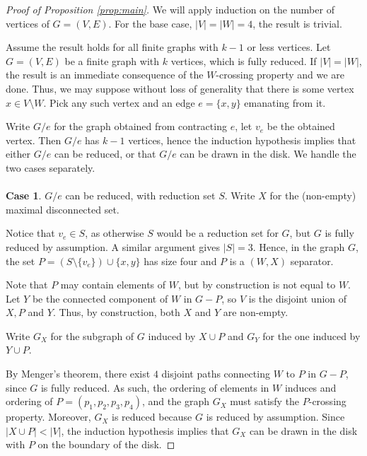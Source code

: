 \documentclass[10pt,a4paper]{amsart}
\newcommand{\DE}[1]{{\color{red} #1}}
\begin{document}
\begin{proof}[Proof of Proposition \ref{prop:main}]
    We will apply induction on the number of vertices of $G = (V, E)$. 
    For the base case, $|V| = |W| = 4$, the result is trivial. 
    
    Assume the result holds for all finite graphs with $ k - 1$ or less vertices.
    Let $G = (V, E)$ be a finite graph with $k$ vertices, which is fully reduced. 
    If $|V| = |W|$, the result is an immediate consequence of the $W$-crossing property and we are done. 
    Thus, we may suppose without loss of generality that there is some vertex $x \in V \setminus W$. 
    Pick any such vertex and an edge $e = \{x, y\}$ emanating from it.
    
    Write $G / e$ for the graph obtained from contracting $e $, let $v_e$ be the obtained vertex. 
    Then $G / e$ has $k - 1$ vertices, hence the induction hypothesis implies that either $G / e$ can be reduced, 
    or that $G / e$ can be drawn in the disk. We handle the two cases separately. 
	\\
	\\
	\noindent \textbf{Case 1}. 
	$G / e$ can be reduced, with reduction set $S$.
    Write $X$ for the (non-empty) maximal disconnected set. 
    
    Notice that $v_e \in S$, as otherwise $S$ would be a reduction set for $G$, but $G$ is fully reduced by assumption. 
    A similar argument gives $|S| = 3$. 
    Hence, in the graph $G$, the set $P = (S \setminus \{v_e\}) \cup \{x, y\}$ has size four and $P$ is a $(W, X)$ separator. 
    
    Note that $P$ may contain elements of $W$, but by construction is not equal to $W$. 
    Let $Y$ be the connected component of $W$ in $G - P$, so $V$ is the disjoint union of $X, P$ and $Y$. 
    Thus, by construction, both $X$ and $Y$ are non-empty. 
    
    Write $G_X$ for the subgraph of $G$ induced by $X \cup P$ and $G_Y$ for the one induced by $Y \cup P$. 
    
    By Menger's theorem, there exist $4$ disjoint paths connecting $W$ to $P$ in $G - P$, 
    since $G$ is fully reduced. 
    As such, the ordering of elements in $W$ induces and ordering of $P = (p_1, p_2, p_3, p_4)$, 
    and the graph $G_X$ must satisfy the $P$-crossing property. 
    Moreover, $G_X$ is reduced because $G$ is reduced by assumption. 
    Since $|X \cup P| < |V|$, the induction hypothesis implies that $G_X$ can be drawn in the disk with $P$ on the boundary of the disk. 
    

\end{proof}
\end{document}
